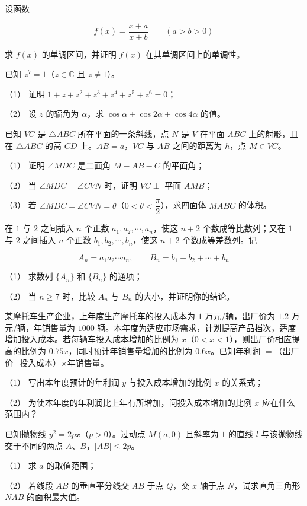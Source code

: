 \begin{question}
设函数

\nopagebreak[4]
\[
f(x)=\frac{x+a}{x+b}\qquad(a>b>0)
\]

求 $f(x)$ 的单调区间，并证明 $f(x)$ 在其单调区间上的单调性。

\end{question}
\begin{question}
已知 $z^7=1$（$z\in\mathbb C$ 且 $z\ne1$）。

（1） 证明 $1+z+z^2+z^3+z^4+z^5+z^6=0$；

（2） 设 $z$ 的辐角为 $\alpha$，求 $\cos\alpha+\cos2\alpha+\cos4\alpha$ 的值。

\Needspace{0.4\textheight}
\end{question}
\begin{question}
已知 $V C$ 是 $\triangle ABC$ 所在平面的一条斜线，点 $N$ 是 $V$ 在平面 $ABC$ 上的射影，且在 $\triangle ABC$ 的高 $CD$ 上。$AB=a$，$VC$ 与 $AB$ 之间的距离为 $h$，点 $M\in VC$。
\nopagebreak[4]
\begin{center}\end{center}
\nopagebreak[4]
（1） 证明 $\angle MDC$ 是二面角 $M-AB-C$ 的平面角；

（2） 当 $\angle MDC=\angle CVN$ 时，证明 $VC\perp$ 平面 $AMB$；

（3） 若 $\angle MDC=\angle CVN=\theta$（$0<\theta<\dfrac\pi2$），求四面体 $MABC$ 的体积。

\end{question}
\begin{question}
在 $1$ 与 $2$ 之间插入 $n$ 个正数 $a_1,a_2,\cdots,a_n$，使这 $n+2$ 个数成等比数列；又在 $1$ 与 $2$ 之间插入 $n$ 个正数 $b_1,b_2,\cdots,b_n$，使这 $n+2$ 个数成等差数列。记

\nopagebreak[4]
\[
A_n=a_1a_2\cdots a_n,\qquad B_n=b_1+b_2+\cdots+b_n
\]

（1） 求数列 $\{A_n\}$ 和 $\{B_n\}$ 的通项；

（2） 当 $n\ge7$ 时，比较 $A_n$ 与 $B_n$ 的大小，并证明你的结论。

\end{question}
\begin{question}
某摩托车生产企业，上年度生产摩托车的投入成本为 $1$ 万元/辆，出厂价为 $1.2$ 万元/辆，年销售量为 $1000$ 辆。本年度为适应市场需求，计划提高产品档次，适度增加投入成本。若每辆车投入成本增加的比例为 $x$（$0<x<1$），则出厂价相应提高的比例为 $0.75x$，同时预计年销售量增加的比例为 $0.6x$。已知年利润 $=$（出厂价$-$投入成本）$\times$年销售量。

（1） 写出本年度预计的年利润 $y$ 与投入成本增加的比例 $x$ 的关系式；

（2） 为使本年度的年利润比上年有所增加，问投入成本增加的比例 $x$ 应在什么范围内？

\end{question}
\begin{question}
已知抛物线 $y^2=2px$（$p>0$）。过动点 $M(a,0)$ 且斜率为 $1$ 的直线 $l$ 与该抛物线交于不同的两点 $A\text{、}B$，$|AB|\le2p$。

（1） 求 $a$ 的取值范围；

（2） 若线段 $AB$ 的垂直平分线交 $AB$ 于点 $Q$，交 $x$ 轴于点 $N$，试求直角三角形 $NAB$ 的面积最大值。

\end{question}